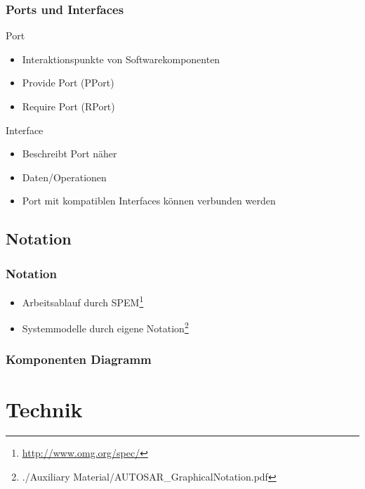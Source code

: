 \documentclass[]{beamer}
\begin{document}
\begin{frame}
\frametitle{Ports und Interfaces}
    \begin{block}{Port}
        \begin{itemize}
            \item Interaktionspunkte von Softwarekomponenten
            \item Provide Port (PPort)
            \item Require Port (RPort)
        \end{itemize}
    \end{block}
    \begin{block}{Interface}
        \begin{itemize}
            \item Beschreibt Port näher
            \item Daten/Operationen
            \item Port mit kompatiblen Interfaces können verbunden werden
        \end{itemize}
    \end{block}
\end{frame}

\subsection{Notation}
\label{sec:Notation}

\begin{frame}
\frametitle{Notation}

    \begin{itemize}
        \item Arbeitsablauf durch SPEM\footnote[frame]{\url{http://www.omg.org/spec/}}
        \item Systemmodelle durch eigene Notation\footnote[frame]{./Auxiliary Material/AUTOSAR\_GraphicalNotation.pdf}
    \end{itemize}

\end{frame}

\begin{frame}
\frametitle{Komponenten Diagramm}

\end{frame}





\section{Technik}
\label{sec:technik}
\end{document}
